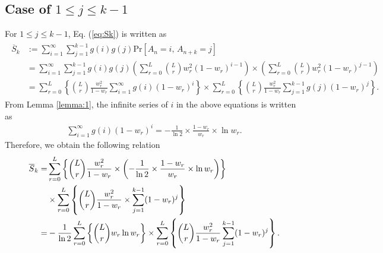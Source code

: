 \documentclass[dvipdfmx,english]{ampmt} %
\begin{document}
\subsection{Case of $1 \leq j \leq k-1$}
For $1 \leq j \leq k-1$, Eq. (\ref{eq:Sk}) is written as
\begin{align}\begin{split}
  \overline{S}_{k} 
  &:= \sum_{i=1}^{\infty} \sum_{j=1}^{k-1} g(i) g(j) \mathrm{Pr} \left[ A_n=i,\,A_{n+k}=j \right] \\
  &= \sum_{i=1}^{\infty} \sum_{j=1}^{k-1} g(i) g(j) \left( \sum_{r=0}^{L} \binom{L}{r}w_r^2 (1-w_r)^{i-1} \right) \times \left( \sum_{r=0}^{L} \binom{L}{r}w_r^2 (1-w_r)^{j-1} \right) \\ 
  &= \sum_{r=0}^{L} \left\{\binom{L}{r} \frac{w_r^2}{1-w_r} \sum_{i=1}^{\infty} g(i)(1-w_r)^{i} \right\}
  \times \sum_{r=0}^{L} \left\{ \binom{L}{r} \frac{w_r^2}{1-w_r} \sum_{j=1}^{k-1} g(j)(1-w_r)^{j} \right\}.
\end{split}\end{align}
From Lemma \ref{lemma:1}, the infinite series of $i$ in the above equations is written as
\begin{align}
	\sum_{i=1}^{\infty} g(i) (1 - w_r)^{i} = - \frac{1}{\ln 2} \times \frac{1-w_r}{w_r}\times\ln w_r.
\end{align}
%
Therefore, we obtain the following relation
\begin{align}\begin{split}
  \overline{S}_{k}
  =& \sum_{r=0}^{L} \left\{ \dbinom{L}{r} \frac{w_r^2}{1-w_r}  \times \left(- \frac{1}{\ln 2} \times \frac{1-w_r}{w_r}\times\ln w_r \right) \right\} \\
  &\times \sum_{r=0}^{L} \left\{ \dbinom{L}{r} \frac{w_r^2}{1-w_r} \times \sum_{j=1}^{k-1} (1-w_r)^{j} \right\} \\
  =&-\frac{1}{\ln 2}\sum_{r=0}^{L} \left\{ \dbinom{L}{r} w_r \ln w_r \right\} \times \sum_{r=0}^{L} \left\{ \dbinom{L}{r} \frac{w_r^2}{1-w_r} \sum_{j=1}^{k-1} (1-w_r)^{j} \right\}.
\end{split}\end{align}
%
\end{document}
